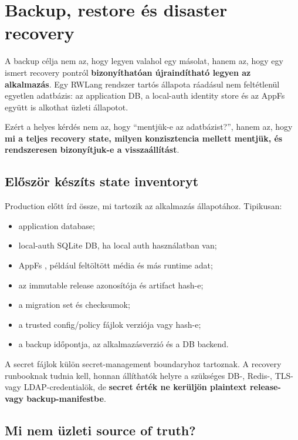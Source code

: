 \chapter{Backup, restore és disaster recovery}\label{ch:recovery}

A backup célja nem az, hogy legyen valahol egy másolat, hanem az, hogy egy ismert recovery pontról \textbf{bizonyíthatóan újraindítható legyen az alkalmazás}. Egy RWLang rendszer tartós állapota ráadásul nem feltétlenül egyetlen adatbázis: az application DB, a local-auth identity store és az AppFs együtt is alkothat üzleti állapotot.

Ezért a helyes kérdés nem az, hogy ``mentjük-e az adatbázist?'', hanem az, hogy \textbf{mi a teljes recovery state, milyen konzisztencia mellett mentjük, és rendszeresen bizonyítjuk-e a visszaállítást}.

\section{Először készíts state inventoryt}

Production előtt írd össze, mi tartozik az alkalmazás állapotához. Tipikusan:

\begin{itemize}
  \item application database;
  \item local-auth SQLite DB, ha local auth használatban van;
  \item AppFs , például feltöltött média és más runtime adat;
  \item az immutable release azonosítója és artifact hash-e;
  \item a migration set és checksumok;
  \item a trusted config/policy fájlok verziója vagy hash-e;
  \item a backup időpontja, az alkalmazásverzió és a DB backend.
\end{itemize}

A secret fájlok külön secret-management boundaryhoz tartoznak. A recovery runbooknak tudnia kell, honnan állíthatók helyre a szükséges DB-, Redis-, TLS- vagy LDAP-credentialök, de \textbf{secret érték ne kerüljön plaintext release- vagy backup-manifestbe}.

\section{Mi nem üzleti source of truth?}

